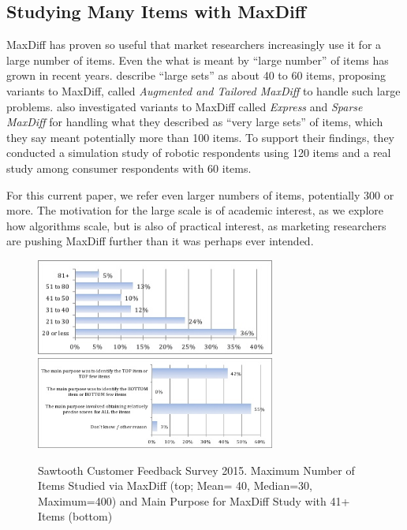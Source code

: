 \documentclass[a4paper,12pt]{article}
\begin{document}
\subsection{Studying Many Items with MaxDiff}

MaxDiff has proven so useful that market researchers increasingly use it for a large number of items. Even the what is meant by ``large number'' of items has grown in recent years. \cite{hendrix2007alternative} describe ``large sets'' as about 40 to 60 items, proposing variants to MaxDiff, called \emph{Augmented and Tailored MaxDiff} to handle such large problems. \cite{wirth2012largeset} also investigated variants to MaxDiff called \emph{Express} and \emph{Sparse MaxDiff} for handling what they described as ``very large sets'' of items, which they say meant potentially more than 100 items.  To support their findings, they conducted a simulation study of robotic respondents using 120 items and a real study among consumer respondents with 60 items.

For this current paper, we refer even larger numbers of items, potentially 300 or more. The motivation for the large scale is of academic interest, as we explore how algorithms scale, but is also of practical interest, as marketing researchers are pushing MaxDiff further than it was perhaps ever intended. 

\begin{figure}
\caption{Sawtooth Customer Feedback Survey 2015. Maximum Number of Items Studied via MaxDiff (top; Mean= 40, Median=30, Maximum=400) and Main Purpose for MaxDiff Study with 41+ Items (bottom) } 
\label{fig:max_and_purpose}
\begin{center} 
\includegraphics[width=0.7\textwidth]{plots/maxnumstudy}
\includegraphics[width=0.7\textwidth]{plots/maxdiffpurpose}
\end{center}
\end{figure}
\end{document}
